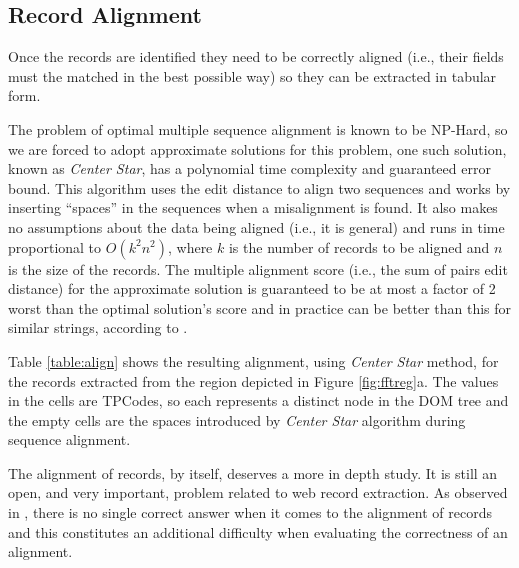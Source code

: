 \documentclass{vldb}
\begin{document}
\subsection{Record Alignment}\label{ss:reca}

Once the records are identified they need to be correctly aligned (i.e., their
fields must the matched in the best possible way) so they can be extracted in
tabular form.

The problem of optimal multiple sequence alignment is known to be
NP-Hard\cite{msanphard2006}, so we are forced to adopt approximate solutions for
this problem, one such solution, known as \textit{Center
Star}\cite{centerstar1993}, has a polynomial time complexity and guaranteed
error bound. This algorithm uses the edit distance to align two sequences and
works by inserting ``spaces'' in the sequences when a misalignment is found. It
also makes no assumptions about the data being aligned (i.e., it is general)
and runs in time proportional to $O(k^2n^2)$, where $k$ is the number of records to be
aligned and $n$ is the size of the records. The multiple alignment score (i.e.,
the sum of pairs edit distance) for the approximate solution is guaranteed to be
at most a factor of 2 worst than the optimal solution's score and in practice
can be better than this for similar strings, according to \cite{centerstar1993}.

Table \ref{table:align} shows the resulting alignment, using \textit{Center
Star} method, for the records extracted from the region depicted in Figure
\ref{fig:fftreg}a. The values in the cells are
TPCodes, so each represents a distinct node in the DOM tree and the empty
cells are the spaces introduced by \textit{Center Star} algorithm
during sequence alignment.

The alignment of records, by itself, deserves a more in depth study. It is still
an open, and very important, problem related to web record extraction. As
observed in \cite{listExtract2009}, there is no single correct answer when it
comes to the alignment of records and this constitutes an additional difficulty
when evaluating the correctness of an alignment.
\end{document}
